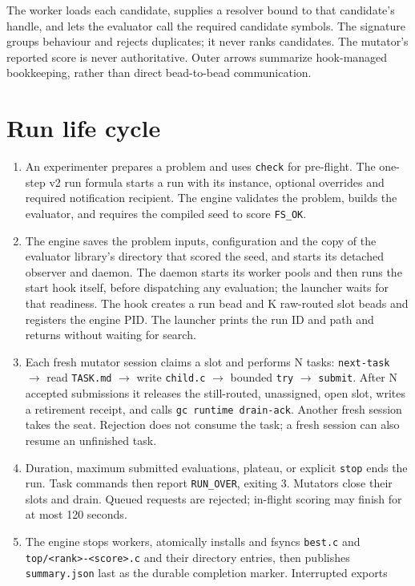 \documentclass[11pt]{article}
\newcommand{\code}[1]{\texttt{#1}}
\begin{document}
The worker loads each candidate, supplies a resolver bound to that candidate's
handle, and lets the evaluator call the required candidate symbols. The
signature groups behaviour and rejects duplicates; it never ranks candidates.
The mutator's reported score is never authoritative. Outer arrows summarize hook-managed bookkeeping, rather than
direct bead-to-bead communication.

\section{Run life cycle}
\begin{enumerate}
\item An experimenter prepares a problem and uses \code{check} for pre-flight.
The one-step v2 run formula starts a run with its instance, optional overrides
and required notification recipient. The engine validates the problem, builds
the evaluator, and requires the compiled seed to score \code{FS\_OK}.
\item The engine saves the problem inputs, configuration and the copy of the
evaluator library's directory that scored the seed, and starts its detached observer and daemon. The
daemon starts its worker pools and then runs the start hook itself, before
dispatching any evaluation; the launcher waits for that readiness.
The hook creates a run bead and K raw-routed slot beads and registers the engine
PID. The launcher prints the run ID and path and returns without waiting for search.
\item Each fresh mutator session claims a slot and performs N tasks:
\code{next-task} $\to$ read \code{TASK.md} $\to$ write \code{child.c} $\to$
bounded \code{try} $\to$ \code{submit}. After N accepted submissions it releases
the still-routed, unassigned, open slot, writes a retirement receipt, and calls
\code{gc runtime drain-ack}. Another fresh session takes the seat. Rejection
does not consume the task; a fresh session can also resume an unfinished task.
\item Duration, maximum submitted evaluations, plateau, or explicit \code{stop}
ends the run. Task commands then report \code{RUN\_OVER}, exiting 3.
Mutators close their slots and drain. Queued requests are rejected; in-flight
scoring may finish for at most 120 seconds.
\item The engine stops workers, atomically installs and fsyncs \code{best.c} and
\code{top/<rank>-<score>.c} and their directory entries, then publishes
\code{summary.json} last as the durable completion marker. Interrupted exports

\end{enumerate}
\end{document}
